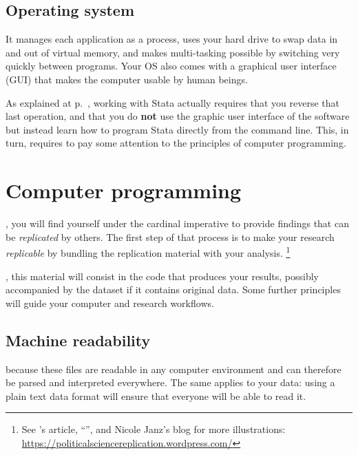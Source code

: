 %
%
\subsection{Operating system}%

 It manages each application as a process, uses your hard drive to swap data in and out of virtual memory, and makes multi-tasking possible by switching very quickly between programs. Your OS also comes with a graphical user interface (GUI) that makes the computer usable by human beings.%

As explained at p.~\pageref{sec:cli}, working with Stata actually requires that you reverse that last operation, and that you do \textbf{not} use the graphic user interface of the software but instead learn how to program Stata directly from the command line. This, in turn, requires to pay some attention to the principles of computer programming.%

%
%
%
\section{Computer programming}%
  
, you will find yourself under the cardinal imperative to provide findings that can be \emph{replicated} by others. The first step of that process is to make your research \emph{replicable} by bundling the replication material with your analysis.%
  \footnote{See \citeauthor{King:1995}'s article, ``'', and Nicole Janz's blog for more illustrations: \url{https://politicalsciencereplication.wordpress.com/}}

, this material will consist in the code that produces your results, possibly accompanied by the dataset if it contains original data. Some further principles will guide your computer and research workflows.%

%
%
\subsection{Machine readability}%

 because these files are readable in any computer environment and can therefore be parsed and interpreted everywhere. The same applies to your data: using a plain text data format will ensure that everyone will be able to read it.%


